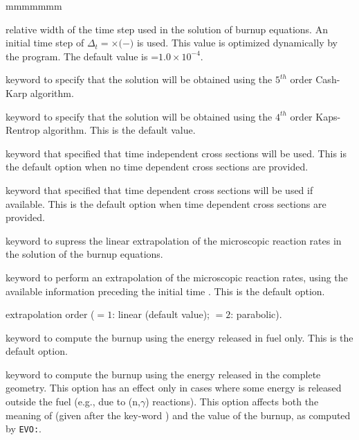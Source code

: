 \begin{ListeDeDescription}{mmmmmmm}
\item[\dusa{valh1}] relative width of the time step used in the solution of
burnup equations. An initial time step of 
$\Delta_{t}=$$\times ($$-$$)$ 
is used. This value is optimized dynamically by the program. The
default value is =$1.0\times 10^{-4}$.

\item[\moc{RUNG}] keyword to specify that the solution will be obtained using
the $5^{th}$ order Cash-Karp algorithm.

\item[\moc{KAPS}] keyword to specify that the solution will be obtained using
the $4^{th}$ order Kaps-Rentrop algorithm. This is the default value.

\item[\moc{TIXS}] keyword that specified that time independent cross sections will be used.
This is the default option when no time dependent cross sections are provided.

\item[\moc{TDXS}] keyword that specified that time dependent cross sections will be used if available.
This is the default option when time dependent cross sections are provided.

\item[\moc{NOEX}] keyword to supress the linear extrapolation of the
microscopic reaction rates in
the solution of the burnup equations.

\item[\moc{EXTR}] keyword to perform an extrapolation of the microscopic reaction rates, using
the available information preceding the initial time . This is the
default option.

\item[\dusa{iextr}] extrapolation order ($=1$: linear (default value); $=2$: parabolic).

\item[\moc{NOGL}] keyword to compute the burnup using the energy released in
fuel only. This is the default option.

\item[\moc{GLOB}]  keyword to compute the burnup using the energy released in
the complete geometry. This option has an effect only in cases where some
energy is released outside the fuel (e.g., due to (n,$\gamma$) reactions).
This option affects both the meaning of  (given after the
key-word ) and the value of the burnup, as computed by {\tt EVO:}.


\end{ListeDeDescription}
